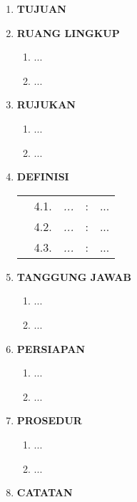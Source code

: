 \documentclass[12pt]{etc.doc}
\begin{document}
    \begin{enumerate}
        \item \textbf{TUJUAN}\\\vspace{1ex} 

        \item \textbf{RUANG LINGKUP}
            \begin{enumerate}
                \item ...
                \item ...
            \end{enumerate}

        \item \textbf{RUJUKAN}
            \begin{enumerate}
                \item ...
                \item ...
            \end{enumerate}

        \item \textbf{DEFINISI}
            \begin{longtable}{p{8pt} r p{3cm} c p{10.98cm}}
                & 4.1. & \textit{...} & : & ...\\
                & 4.2. & \textit{...} & : & ...\\
                & 4.3. & \textit{...} & : & ...\\
            \end{longtable}

        \item \textbf{TANGGUNG JAWAB}
            \begin{enumerate}
                \item ...
                \item ...
            \end{enumerate}

        \item \textbf{PERSIAPAN}
            \begin{enumerate}
                \item ...
                \item ...
            \end{enumerate}

        \item \textbf{PROSEDUR}
            \begin{enumerate}
                \item ...
                \item ...
            \end{enumerate}

        \item \textbf{CATATAN}
    \end{enumerate}
\end{document}
